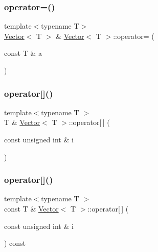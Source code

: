 \mbox{\label{classVector_a6bbf5f187006ef2567fdcebd37ebfa97_a6bbf5f187006ef2567fdcebd37ebfa97}} 
\subsubsection{\texorpdfstring{operator=()}{operator=()}\hspace{0.1cm}{\footnotesize\ttfamily [2/2]}}
{\footnotesize\ttfamily template$<$typename T$>$ \\
\mbox{\hyperlink{classVector}{Vector}}$<$ T $>$ \& \mbox{\hyperlink{classVector}{Vector}}$<$ T $>$\+::operator= (\begin{DoxyParamCaption}\item[{const T \&}]{a }\end{DoxyParamCaption})\hspace{0.3cm}{\ttfamily [inline]}}

\mbox{\label{classVector_aa07a0c8ca467e2ce190afc26054cf422_aa07a0c8ca467e2ce190afc26054cf422}} 
\subsubsection{\texorpdfstring{operator[]()}{operator[]()}\hspace{0.1cm}{\footnotesize\ttfamily [1/2]}}
{\footnotesize\ttfamily template$<$typename T $>$ \\
T \& \mbox{\hyperlink{classVector}{Vector}}$<$ T $>$\+::operator\mbox{[}$\,$\mbox{]} (\begin{DoxyParamCaption}\item[{const unsigned int \&}]{i }\end{DoxyParamCaption})\hspace{0.3cm}{\ttfamily [inline]}}

\mbox{\label{classVector_a36cc881f0270de628bec7a80bbdab741_a36cc881f0270de628bec7a80bbdab741}} 
\subsubsection{\texorpdfstring{operator[]()}{operator[]()}\hspace{0.1cm}{\footnotesize\ttfamily [2/2]}}
{\footnotesize\ttfamily template$<$typename T $>$ \\
const T \& \mbox{\hyperlink{classVector}{Vector}}$<$ T $>$\+::operator\mbox{[}$\,$\mbox{]} (\begin{DoxyParamCaption}\item[{const unsigned int \&}]{i }\end{DoxyParamCaption}) const\hspace{0.3cm}{\ttfamily [inline]}}

